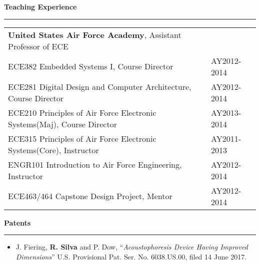 \newpage

\large
\textbf{Teaching Experience}\\
\rule{\textwidth}{1pt}

\begin{table}[h!]
\centering
\small
\begin{tabular}{ p{12.5cm} p{4.5cm}}
	\textbf{United States Air Force Academy}, Assistant Professor of ECE& \\
ECE382 Embedded Systems I, Course Director& AY2012-2014\\
ECE281 Digital Design and Computer Architecture, Course Director & AY2012-2014\\
ECE210 Principles of Air Force Electronic Systems(Maj), Course Director & AY2013-2014\\
ECE315 Principles of Air Force Electronic Systems(Core), Instructor & AY2011-2013\\
ENGR101 Introduction to Air Force Engineering, Instructor & AY2012-2014\\
ECE463/464 Capstone Design Project, Mentor & AY2012-2014
\end{tabular}
\end{table}

\large
\textbf{Patents}\\
\rule{\textwidth}{1pt}

\small
\begin{itemize}
	\item{J. Fiering, \textbf{R. Silva} and P. Dow, ``\textit{Acoustophoresis Device Having Improved Dimensions}'' U.S. Provisional Pat. Ser. No. 6038.US.00, filed 14 June 2017.}
\end{itemize}
